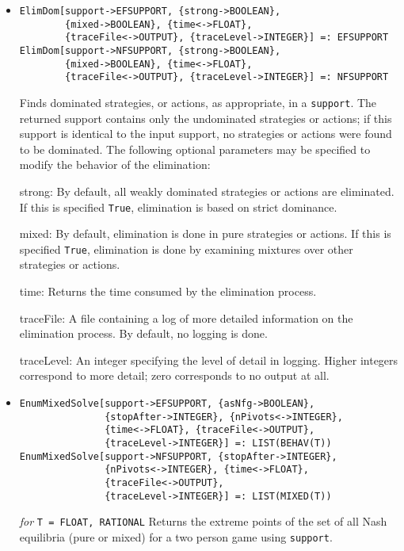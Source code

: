 \begin{itemize}
\item{}
\protect \large \begin{verbatim}
ElimDom[support->EFSUPPORT, {strong->BOOLEAN},
        {mixed->BOOLEAN}, {time<->FLOAT},
        {traceFile<->OUTPUT}, {traceLevel->INTEGER}] =: EFSUPPORT
ElimDom[support->NFSUPPORT, {strong->BOOLEAN},
        {mixed->BOOLEAN}, {time<->FLOAT},
        {traceFile<->OUTPUT}, {traceLevel->INTEGER}] =: NFSUPPORT
\end{verbatim}\normalsize

\bd
Finds dominated strategies, or actions, as appropriate, in a 
\verb+support+.  The returned support contains only the undominated
strategies or actions; if this support is identical to the input support,
no strategies or actions were found to be dominated.  The following
optional parameters may be specified to modify the behavior of
the elimination:

\bd
\item [strong:] By default, all weakly dominated strategies or actions
are eliminated.  If this is specified \verb+True+, elimination is based
on strict dominance.
\item [mixed:] By default, elimination is done in pure strategies or
actions.  If this is specified \verb+True+, elimination is done by
examining mixtures over other strategies or actions.
\item [time:] Returns the time consumed by the elimination process.
\item [traceFile:] A file containing a log of more detailed information
on the elimination process.  By default, no logging is done.
\item [traceLevel:] An integer specifying the level of detail in logging.
Higher integers correspond to more detail; zero corresponds to no output
at all.
\ed
\ed

\item{}
\protect \large \begin{verbatim}
EnumMixedSolve[support->EFSUPPORT, {asNfg->BOOLEAN}, 
               {stopAfter->INTEGER}, {nPivots<->INTEGER}, 
               {time<->FLOAT}, {traceFile<->OUTPUT},
               {traceLevel->INTEGER}] =: LIST(BEHAV(T))
EnumMixedSolve[support->NFSUPPORT, {stopAfter->INTEGER},
               {nPivots<->INTEGER}, {time<->FLOAT},
               {traceFile<->OUTPUT},
               {traceLevel->INTEGER}] =: LIST(MIXED(T))
\end{verbatim}\normalsize

{\it for} {\tt T = FLOAT, RATIONAL}
\bd
Returns the extreme points of the set of all Nash equilibria (pure or
mixed) for a two person game using \verb+support+.


\end{itemize}
